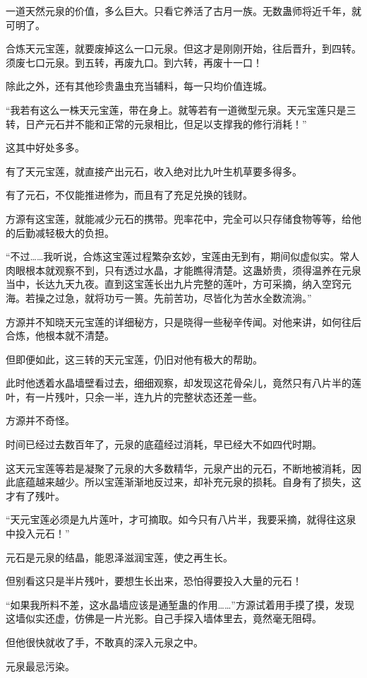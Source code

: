 \begin{this_body}
一道天然元泉的价值，多么巨大。只看它养活了古月一族。无数蛊师将近千年，就可明了。

合炼天元宝莲，就要废掉这么一口元泉。但这才是刚刚开始，往后晋升，到四转。须废七口元泉。到五转，再废九口。到六转，再废十一口！

除此之外，还有其他珍贵蛊虫充当辅料，每一只均价值连城。

“我若有这么一株天元宝莲，带在身上。就等若有一道微型元泉。天元宝莲只是三转，日产元石并不能和正常的元泉相比，但足以支撑我的修行消耗！”

这其中好处多多。

有了天元宝莲，就直接产出元石，收入绝对比九叶生机草要多得多。

有了元石，不仅能推进修为，而且有了充足兑换的钱财。

方源有这宝莲，就能减少元石的携带。兜率花中，完全可以只存储食物等等，给他的后勤减轻极大的负担。

“不过……我听说，合炼这宝莲过程繁杂玄妙，宝莲由无到有，期间似虚似实。常人肉眼根本就观察不到，只有透过水晶，才能瞧得清楚。这蛊娇贵，须得温养在元泉当中，长达九天九夜。直到这宝莲长出九片完整的莲叶，方可采摘，纳入空窍元海。若操之过急，就将功亏一篑。先前苦功，尽皆化为苦水全数流淌。”

方源并不知晓天元宝莲的详细秘方，只是晓得一些秘辛传闻。对他来讲，如何往后合炼，他根本就不清楚。

但即便如此，这三转的天元宝莲，仍旧对他有极大的帮助。

此时他透着水晶墙壁看过去，细细观察，却发现这花骨朵儿，竟然只有八片半的莲叶，有一片残叶，只余一半，连九片的完整状态还差一些。

方源并不奇怪。

时间已经过去数百年了，元泉的底蕴经过消耗，早已经大不如四代时期。

这天元宝莲等若是凝聚了元泉的大多数精华，元泉产出的元石，不断地被消耗，因此底蕴越来越少。所以宝莲渐渐地反过来，却补充元泉的损耗。自身有了损失，这才有了残叶。

“天元宝莲必须是九片莲叶，才可摘取。如今只有八片半，我要采摘，就得往这泉中投入元石！”

元石是元泉的结晶，能恩泽滋润宝莲，使之再生长。

但别看这只是半片残叶，要想生长出来，恐怕得要投入大量的元石！

“如果我所料不差，这水晶墙应该是通堑蛊的作用……”方源试着用手摸了摸，发现这墙似实还虚，仿佛是一片光影。自己手探入墙体里去，竟然毫无阻碍。

但他很快就收了手，不敢真的深入元泉之中。

元泉最忌污染。


\end{this_body}
